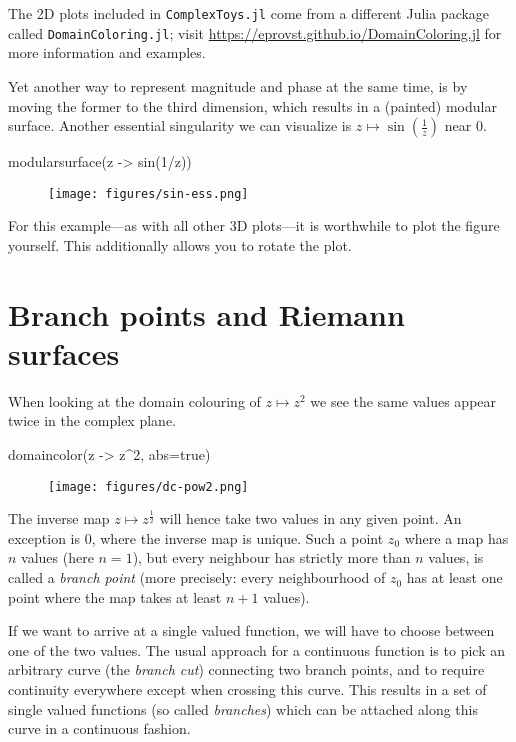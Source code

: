 \documentclass[a4paper]{article}
\begin{document}
The 2D plots included in \texttt{ComplexToys.jl} come from a different Julia package
called \texttt{DomainColoring.jl}; visit
\url{https://eprovst.github.io/DomainColoring.jl} for more information and
examples.

Yet another way to represent magnitude and phase at the same time, is by moving
the former to the third dimension, which results in a (painted) modular surface.
Another essential singularity we can visualize is
$z \mapsto \sin\left(\frac{1}{z}\right)$ near $0$.

\begin{juliaverbatim}
	modularsurface(z -> sin(1/z))
\end{juliaverbatim}
\begin{figure}[H]
	\centering
	\texttt{[image: figures/sin-ess.png]}
\end{figure}

For this example---as with all other 3D plots---it is worthwhile to plot the
figure yourself. This additionally allows you to rotate the plot.

\section{Branch points and Riemann surfaces}

When looking at the domain colouring of $z \mapsto z^2$ we see the same values
appear twice in the complex plane.

\begin{juliaverbatim}
	domaincolor(z -> z^2, abs=true)
\end{juliaverbatim}
\begin{figure}[H]
	\centering
	\texttt{[image: figures/dc-pow2.png]}
\end{figure}

The inverse map $z \mapsto z^{\frac{1}{2}}$ will hence take two values in any
given point. An exception is $0$, where the inverse map is unique. Such a point
$z_0$ where a map has $n$ values (here $n=1$), but every neighbour has strictly
more than $n$ values, is called a \emph{branch point} (more precisely: every
neighbourhood of $z_0$ has at least one point where the map takes at least $n+1$
values).

If we want to arrive at a single valued function, we will have to choose between
one of the two values. The usual approach for a continuous function is to pick
an arbitrary curve (the \emph{branch cut}) connecting two branch points, and to
require continuity everywhere except when crossing this curve. This results in a
set of single valued functions (so called \emph{branches}) which can be attached
along this curve in a continuous fashion.
\end{document}
